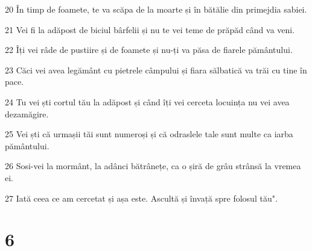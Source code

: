 \par 20 În timp de foamete, te va scăpa de la moarte și în bătălie din primejdia sabiei.
\par 21 Vei fi la adăpost de biciul bârfelii și nu te vei teme de prăpăd când va veni.
\par 22 Îți vei râde de pustiire și de foamete și nu-ți va păsa de fiarele pământului.
\par 23 Căci vei avea legământ cu pietrele câmpului și fiara sălbatică va trăi cu tine în pace.
\par 24 Tu vei ști cortul tău la adăpost și când îți vei cerceta locuința nu vei avea dezamăgire.
\par 25 Vei ști că urmașii tăi sunt numeroși și că odraslele tale sunt multe ca iarba pământului.
\par 26 Sosi-vei la mormânt, la adânci bătrânețe, ca o șiră de grâu strânsă la vremea ei.
\par 27 Iată ceea ce am cercetat și așa este. Ascultă și învață spre folosul tău".

\chapter{6}

